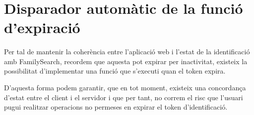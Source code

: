 \section{Disparador automàtic de la funció d'expiració}

    \paragraph{}
    Per tal de mantenir la coherència entre l'aplicació web i l'estat de la identificació amb FamilySearch, recordem que aquesta pot expirar per inactivitat, existeix la possibilitat d'implementar una funció que s'executi quan el token expira.

    D'aquesta forma podem garantir, que en tot moment, existeix una concordança d'estat entre el client i el servidor i que per tant, no correm el risc que l'usuari pugui realitzar operacions no permeses en expirar el token d’identificació.
